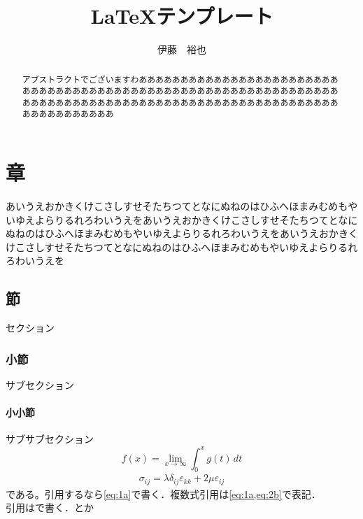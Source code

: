 \documentclass[12pt,a4paper,onecolumn]{jsreport}
\title{LaTeXテンプレート}
\author{伊藤　裕也}
\begin{document}

\date{}
\maketitle



\begin{abstract}
    アブストラクトでございますわあああああああああああああああああああああああああああああああああああああああああああああああああああああああああああああああああああああああああああああああああああああああああああああああああああああああああああああああ
\end{abstract}


\tableofcontents    %
\clearpage



\setcounter{page}{1}

\chapter{章}
\thispagestyle{fancy}
あいうえおかきくけこさしすせそたちつてとなにぬねのはひふへほまみむめもやいゆえよらりるれろわいうえをあいうえおかきくけこさしすせそたちつてとなにぬねのはひふへほまみむめもやいゆえよらりるれろわいうえをあいうえおかきくけこさしすせそたちつてとなにぬねのはひふへほまみむめもやいゆえよらりるれろわいうえを

\section{節}
セクション

\subsection{小節}
サブセクション

\subsubsection{小小節}
サブサブセクション
\begin{equation}
    f(x) = \lim_{x\to\infty} \int_0^x g(t)\,dt
    \label{eq:1a}
\end{equation}
\begin{align}
    \sigma_{ij}=\lambda\delta_{ij}\varepsilon_{kk}+2\mu\varepsilon_{ij}
    \label{eq:2b}
\end{align}
である。引用するなら\cref{eq:1a}で書く．複数式引用は\cref{eq:1a,eq:2b}で表記．\\
引用は\cite{Nagai2020}で書く．\cite{akiyama2015m}とか
\end{document}
